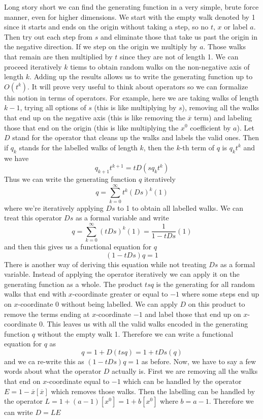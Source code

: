 \documentclass[12pt]{article}
\theoremstyle{definition} \newtheorem{definition}[theorem]{Definition}
\newcommand{\ol}[1]{\overline{#1}}
\begin{document}
Long story short we can find the generating function in a very simple, brute force manner, even for higher dimensions. We start with the empty walk denoted by 1 since it starts and ends on the origin without taking a step, so no $t$, $x$ or label $a$. Then try out each step from $s$ and eliminate those that take us past the origin in the negative direction. If we step on the origin we multiply by $a$. Those walks that remain are then multiplied by $t$ since they are not of length 1. We can proceed iteratively $k$ tiems to obtain random walks on the non-negative axis of length $k$. Adding up the results allows us to write the generating function up to $O(t^k)$. It will prove very useful to think about operators so we can formalize this notion in terms of operators. For example, here we are taking walks of length $k-1$, trying all options of $s$ (this is like multiplying by $s$), removing all the walks that end up on the negative axis (this is like removing the $\ol{x}$ term) and labeling those that end on the origin (this is like multiplying the $x^0$ coefficient by $a$). Let $D$ stand for the operator that cleans up the walks and labels the valid ones. Then if $q_k$ stands for the labelled walks of length $k$, then the $k$-th term of $q$ is $q_k t^k$ and we have
\[
	q_{k+1}t^{k+1} = t D (s q_k t^k)
\]
Thus we can write the generating function $q$ iteratively
\[
	q = \sum_{k=0}^\infty t^k(Ds)^k(1)
\]
where we're iteratively applying $Ds$ to 1 to obtain all labelled walks. We can treat this operator $Ds$ as a formal variable and write
\[
	q = \sum_{k=0}^\infty (tDs)^k(1) = \frac{1}{1-tDs}(1)
\]
and then this gives us a functional equation for $q$
\[
	(1-tDs)q  =1 
\]
There is another way of deriving this equation while not treating $Ds$ as a formal variable. Instead of applying the operator iteratively we can apply it on the generating function as a whole. The product $tsq$ is the generating for all random walks that end with $x$-coordinate greater or equal to $-1$ where some steps end up on $x$-coordinate 0 without being labelled. We can apply $D$ on this product to remove the terms ending at $x$-coordinate $-1$ and label those that end up on $x$-coordinate 0. This leaves us with all the valid walks encoded in the generating function $q$ without the empty walk 1. Therefore we can write a functional equation for $q$ as
\[
	q = 1 + D(tsq) = 1 + tDs(q)
\]
and we ca re-write this as $(1-tDs)q  =1$ as before. Now, we have to say a few words about what the operator $D$ actually is. First we are removing all the walks that end on $x$-coordinate equal to $-1$ which can be handled by the operator $E = 1 - \ol{x}[\ol{x}]$ which removes those walks. Then the labelling can be handled by the operator $L = 1 + (a-1) [x^0] = 1 + b[x^0]$ where $b = a-1$. Therefore we can write $D  = LE$
\end{document}
